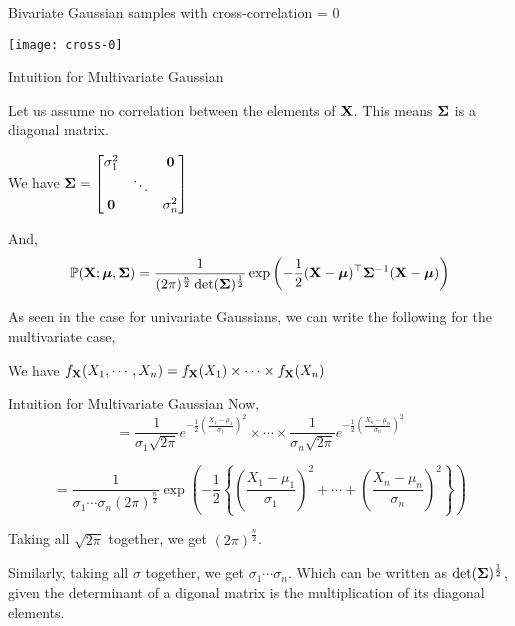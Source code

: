 \documentclass{beamer}
\begin{document}
\begin{frame}{Bivariate Gaussian samples with cross-correlation  = 0}
	\begin{center}
		\texttt{[image: cross-0]}
	\end{center}
\end{frame}



\begin{frame}{Intuition for Multivariate Gaussian}
	
	Let us assume no correlation between the elements of $\mathbf{X}$. This means $\boldsymbol{\Sigma}$ is a diagonal matrix.
	
	We have $\boldsymbol{\Sigma} = \begin{bmatrix} 
	\sigma_{1}^2 & & \mathbf{0}\\
	 & \ddots &\\
	\mathbf{0} &  & \sigma_n^2 
	\end{bmatrix}
	$ 
	
	And,
	\begin{gather}
		\mathbb{P}(\mathbf{X} ; \boldsymbol{\mu}, \boldsymbol{\Sigma})=\frac{1}{(2 \pi)^{\frac{n}{2}}\operatorname{det}(\boldsymbol{\Sigma})^{\frac{1}{2}}} \exp \left(-\frac{1}{2}(\mathbf{X}-\boldsymbol{\mu})^\top \boldsymbol{\Sigma}^{-1}(\mathbf{X}-\boldsymbol{\mu})\right)
	\end{gather}
	
	As seen in the case for univariate Gaussians, we can write the following for the multivariate case,
	
	We have $f_{\mathbf{X}}(X_1, \cdots, X_n) = f_{\mathbf{X}}(X_1)\times \cdots \times f_{\mathbf{X}}(X_n)$
\end{frame}

\begin{frame}{Intuition for Multivariate Gaussian}
	Now,
	$$=\frac{1}{\sigma_1 \sqrt{2\pi} } e^{-\frac{1}{2}\left(\frac{X_1-\mu_1}{\sigma_1}\right)^2} \times \cdots \times \frac{1}{\sigma_n \sqrt{2\pi} } e^{-\frac{1}{2}\left(\frac{X_n-\mu_n}{\sigma_n}\right)^2}$$
	
	$$= \frac{1}{\sigma_1 \cdots \sigma_n (2\pi)^{\frac{n}{2}} } \exp\left(-\frac{1}{2}\left\{\left(\frac{X_1-\mu_1}{\sigma_1}\right)^2 + \cdots + \left(\frac{X_n-\mu_n}{\sigma_n}\right)^2 \right\}\right)  $$
	
	Taking all $\sqrt{2\pi}$ together, we get $(2\pi)^{\frac{n}{2}}$.
	
	Similarly, taking all $\sigma$ together, we get $\sigma_1 \cdots \sigma_n$. Which can be written as $\operatorname{det}(\boldsymbol{\Sigma})^{\frac{1}{2}}$, given the determinant of a digonal matrix is the multiplication of its diagonal elements.
\end{frame}
\end{document}
